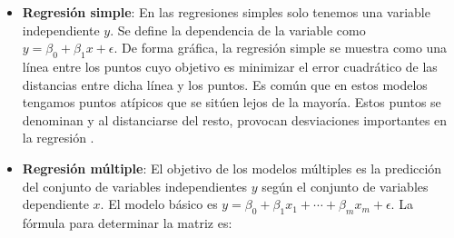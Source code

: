 \begin{itemize}
  \item \textbf{Regresión simple}: En las regresiones simples solo tenemos una variable independiente $y$. Se define la dependencia de la variable como $y = \beta_0 + \beta_1 x + \epsilon$. De forma gráfica, la regresión simple se muestra como una línea entre los puntos cuyo objetivo es minimizar el error cuadrático de las distancias entre dicha línea y los puntos. Es común que en estos modelos tengamos puntos atípicos que se sitúen lejos de la mayoría. Estos puntos se denominan  y al distanciarse del resto, provocan desviaciones importantes en la regresión .
  \item \textbf{Regresión múltiple}: El objetivo de los modelos múltiples es la predicción del conjunto de variables independientes $y$ según el conjunto de variables dependiente $x$. El modelo básico es $y = \beta_0 + \beta_1 x_1 + \cdots + \beta_m x_m + \epsilon$. La fórmula para determinar la matriz es:


\end{itemize}
